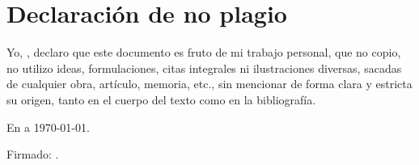 %
\newpage
{}%
\chapter*{Declaración de no plagio}
Yo, \autor, declaro que este documento es fruto de mi trabajo personal, que no copio, no utilizo ideas, formulaciones, citas integrales ni ilustraciones diversas, sacadas de cualquier obra, artículo, memoria, etc., sin mencionar de forma clara y estricta su origen, tanto en el cuerpo del texto como en la bibliografía.

En \lugar a \today.

Firmado: \autor.
%